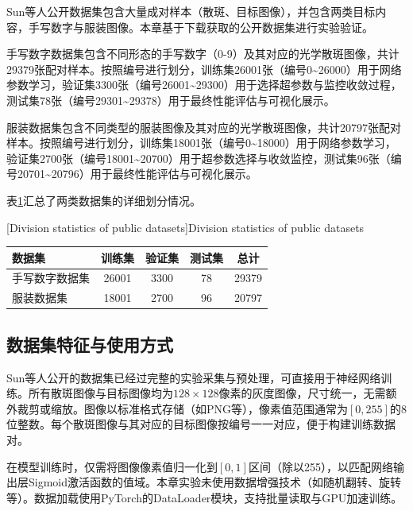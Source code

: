 {Sun等人公开数据集包含大量成对样本（散斑、目标图像），并包含两类目标内容，手写数字与服装图像。本章基于下载获取的公开数据集进行实验验证。

手写数字数据集包含不同形态的手写数字（0-9）及其对应的光学散斑图像，共计29379张配对样本。按照编号进行划分，训练集26001张（编号0\textasciitilde26000）用于网络参数学习，验证集3300张（编号26001\textasciitilde29300）用于选择超参数与监控收敛过程，测试集78张（编号29301\textasciitilde29378）用于最终性能评估与可视化展示。

服装数据集包含不同类型的服装图像及其对应的光学散斑图像，共计20797张配对样本。按照编号进行划分，训练集18001张（编号0\textasciitilde18000）用于网络参数学习，验证集2700张（编号18001\textasciitilde20700）用于超参数选择与收敛监控，测试集96张（编号20701\textasciitilde20796）用于最终性能评估与可视化展示。

表\ref{tab:dataset_division}汇总了两类数据集的详细划分情况。

\begin{table}[!htbp]
    \centering
    [Division statistics of public datasets]{\enspace Division statistics of public datasets}
    \label{tab:dataset_division}
    \footnotesize
    \setlength{\tabcolsep}{10pt}
    \renewcommand{\arraystretch}{1.2}
    \begin{tabular}{lcccc}
        \hline
        数据集 & 训练集 & 验证集 & 测试集 & 总计 \\
        \hline
        手写数字数据集 & 26001 & 3300 & 78 & 29379 \\
        服装数据集 & 18001 & 2700 & 96 & 20797 \\
        \hline
    \end{tabular}
\end{table}

\subsection{数据集特征与使用方式}\label{sec:dataset_preprocess}

Sun等人公开的数据集已经过完整的实验采集与预处理，可直接用于神经网络训练。所有散斑图像与目标图像均为$128\times 128$像素的灰度图像，尺寸统一，无需额外裁剪或缩放。图像以标准格式存储（如PNG等），像素值范围通常为$[0, 255]$的8位整数。每个散斑图像与其对应的目标图像按编号一一对应，便于构建训练数据对。

在模型训练时，仅需将图像像素值归一化到$[0,1]$区间（除以255），以匹配网络输出层Sigmoid激活函数的值域。本章实验未使用数据增强技术（如随机翻转、旋转等）。数据加载使用PyTorch的DataLoader模块，支持批量读取与GPU加速训练。

}
